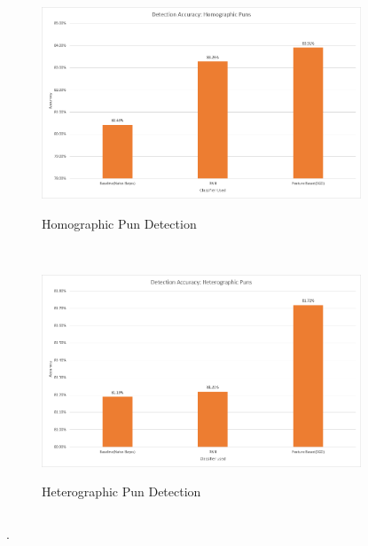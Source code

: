 \documentclass[final]{beamer}
\newlength{\onecolwid}
\newlength{\twocolwid}
\begin{document}
\begin{frame}[t]
\begin{columns}[t]
\begin{column}{\twocolwid}
\begin{columns}[t,totalwidth=\twocolwid]
\begin{column}{\onecolwid}
					\begin{figure}
						\includegraphics[width=0.85\textwidth]{HomographicDetection.png}\\
						\caption{\hspace{50mm}Homographic Pun Detection}
					\end{figure}
					\\
					\vspace{20mm}
					\begin{figure}
						\includegraphics[width=0.85\textwidth]{HeterographicDetection.png}\\
						\caption{\hspace{50mm}Heterographic Pun Detection}
					\end{figure}
				\end{column}
			\end{columns}
			\begin{block}
				{.}
			\end{block}

\end{column}
\end{columns}
\end{frame}
\end{document}
